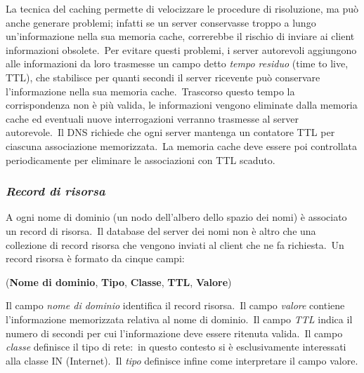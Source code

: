 La tecnica del caching permette di velocizzare le procedure di risoluzione, ma può anche generare problemi; infatti se un server conservasse troppo a lungo un'informazione nella sua memoria cache, correrebbe il rischio di inviare ai client informazioni obsolete.\
Per evitare questi problemi, i server autorevoli aggiungono alle informazioni da loro trasmesse un campo detto \emph{tempo residuo} (time to live, TTL), che stabilisce per quanti secondi il server ricevente può conservare l'informazione nella sua memoria cache.\
Trascorso questo tempo la corrispondenza non è più valida, le informazioni vengono eliminate dalla memoria cache ed eventuali nuove interrogazioni verranno trasmesse al server autorevole.\
Il DNS richiede che ogni server mantenga un contatore TTL per ciascuna associazione memorizzata.\
La memoria cache deve essere poi controllata periodicamente per eliminare le associazioni con TTL scaduto.

\subsubsection{\emph{Record di risorsa}}

A ogni nome di dominio (un nodo dell'albero dello spazio dei nomi) è associato un record di risorsa.\
Il database del server dei nomi non è altro che una collezione di record risorsa che vengono inviati al client che ne fa richiesta.\
Un record risorsa è formato da cinque campi:

\begin{center}
    (\textbf{Nome di dominio}, \textbf{Tipo}, \textbf{Classe}, \textbf{TTL}, \textbf{Valore})
\end{center}

Il campo \emph{nome di dominio} identifica il record risorsa.\
Il campo \emph{valore} contiene l'informazione memorizzata relativa al nome di dominio.\
Il campo \emph{TTL} indica il numero di secondi per cui l'informazione deve essere ritenuta valida.\
Il campo \emph{classe} definisce il tipo di rete:\ in questo contesto si è esclusivamente interessati alla classe IN (Internet).\
Il \emph{tipo} definisce infine come interpretare il campo valore.

